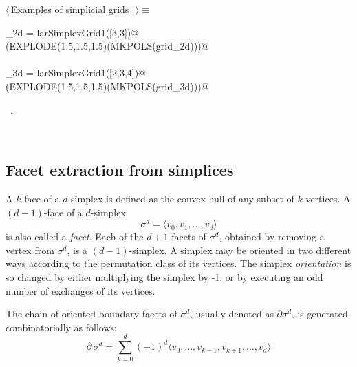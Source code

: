 \documentclass[11pt,oneside]{article}	%
\begin{document}
\begin{flushleft} \small
\begin{minipage}{\linewidth} \label{scrap7}
$\langle\,$Examples of simplicial grids\nobreak\ {\footnotesize {}}$\,\rangle\equiv$
\vspace{-1ex}
\begin{list}{}{} \item
\mbox{}\verb@grid_2d = larSimplexGrid1([3,3])@\\
\mbox{}\verb@VIEW(EXPLODE(1.5,1.5,1.5)(MKPOLS(grid_2d)))@\\
\mbox{}\verb@@\\
\mbox{}\verb@grid_3d = larSimplexGrid1([2,3,4])@\\
\mbox{}\verb@VIEW(EXPLODE(1.5,1.5,1.5)(MKPOLS(grid_3d)))@\\
\mbox{}\verb@@{\NWsep}
\end{list}
\vspace{-1ex}
\footnotesize\addtolength{\baselineskip}{-1ex}
\begin{list}{}{\setlength{\itemsep}{-\parsep}\setlength{\itemindent}{-\leftmargin}}
\item \NWtxtMacroRefIn\ .
\end{list}
\end{minipage}\\[4ex]
\end{flushleft}


\subsection{Facet extraction from simplices}

A $k$-face of a $d$-simplex is defined as the convex hull of any subset of $k$ vertices.
A $(d-1)$-face of a $d$-simplex 
\[
\sigma^d = \langle v_0, v_1, \ldots, v_d \rangle
\]
 is also called a \emph{facet}. Each of the $d+1$ facets of $\sigma^d$, obtained by removing a vertex from $\sigma^d$, is a $(d-1)$-simplex. A simplex may be oriented in two different ways according to the permutation
class of its vertices. The simplex \emph{orientation} is so changed by either multiplying the simplex by -1, or by executing an odd number of exchanges of its vertices. 

The chain of oriented boundary facets of $\sigma^d$, usually denoted as $\partial \sigma^d$, is generated combinatorially as follows:
\[
\partial\, \sigma^d = \sum_{k=0}^d (-1)^d \langle v_0, \ldots, v_{k-1}, v_{k+1}, \ldots, v_d \rangle
\]
\end{document}
